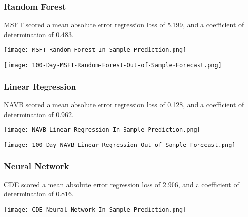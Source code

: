 \subsubsection{Random Forest}
MSFT scored a mean absolute error regression loss of 5.199, and a coefficient of determination of 0.483.

\begin{center}
    \texttt{[image: MSFT-Random-Forest-In-Sample-Prediction.png]}
    \label{fig:nonfloat}
\end{center}

\begin{center}  
    \texttt{[image: 100-Day-MSFT-Random-Forest-Out-of-Sample-Forecast.png]}
    \label{fig:nonfloat}
\end{center}

\subsubsection{Linear Regression}

NAVB scored a mean absolute error regression loss of 0.128, and a coefficient of determination of 0.962.

\begin{center}
    \texttt{[image: NAVB-Linear-Regression-In-Sample-Prediction.png]}
    \label{fig:nonfloat}
\end{center}

\begin{center}  
    \texttt{[image: 100-Day-NAVB-Linear-Regression-Out-of-Sample-Forecast.png]}
    \label{fig:nonfloat}
\end{center}

\subsubsection{Neural Network}

CDE scored a mean absolute error regression loss of 2.906, and a coefficient of determination of 0.816.

\begin{center}
    \texttt{[image: CDE-Neural-Network-In-Sample-Prediction.png]}
    \label{fig:nonfloat}
\end{center}

